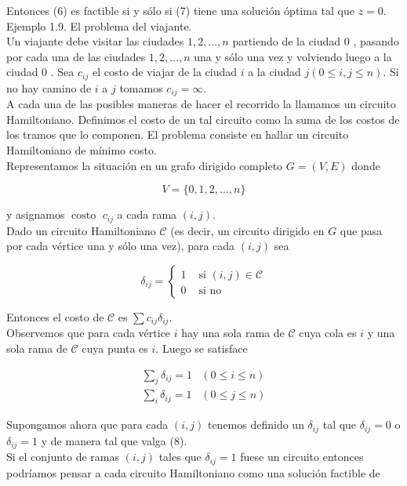 \documentclass[10pt]{article}
\begin{document}
Entonces (6) es factible si y sólo si (7) tiene una solución óptima tal que $z=0$.\\
Ejemplo 1.9. El problema del viajante.\\
Un viajante debe visitar las ciudades $1,2, \ldots, n$ partiendo de la ciudad 0 , pasando por cada una de las ciudades $1,2, \ldots, n$ una y sólo una vez y volviendo luego a la ciudad 0 . Sea $c_{i j}$ el costo de viajar de la ciudad $i$ a la ciudad $j(0 \leq i, j \leq n)$. Si no hay camino de $i$ a $j$ tomamos $c_{i j}=\infty$.\\
A cada una de las posibles maneras de hacer el recorrido la llamamos un circuito Hamiltoniano. Definimos el costo de un tal circuito como la suma de los costos de los tramos que lo componen. El problema consiste en hallar un circuito Hamiltoniano de mínimo costo.\\
Representamos la situación en un grafo dirigido completo $G=(V, E)$ donde

$$
V=\{0,1,2, \ldots, n\}
$$

y asignamos $\operatorname{costo~} c_{i j}$ a cada rama $(i, j)$.\\
Dado un circuito Hamiltoniano $\mathcal{C}$ (es decir, un circuito dirigido en $G$ que pasa por cada vértice una y sólo una vez), para cada $(i, j)$ sea

$$
\delta_{i j}= \begin{cases}1 & \text { si }(i, j) \in \mathcal{C} \\ 0 & \text { si no }\end{cases}
$$

Entonces el costo de $\mathcal{C}$ es $\sum c_{i j} \delta_{i j}$.\\
Observemos que para cada vértice $i$ hay una sola rama de $\mathcal{C}$ cuya cola es $i$ y una sola rama de $\mathcal{C}$ cuya punta es $i$. Luego se satisface

\[
\begin{array}{ll}
\sum_{j} \delta_{i j}=1 & (0 \leq i \leq n) \\
\sum_{i} \delta_{i j}=1 & (0 \leq j \leq n) \tag{8}
\end{array}
\]

Supongamos ahora que para cada $(i, j)$ tenemos definido un $\delta_{i j}$ tal que $\delta_{i j}=0$ o $\delta_{i j}=1$ y de manera tal que valga (8).\\
Si el conjunto de ramas $(i, j)$ tales que $\delta_{i j}=1$ fuese un circuito entonces podríamos pensar a cada circuito Hamiltoniano como una solución factible de
\end{document}
